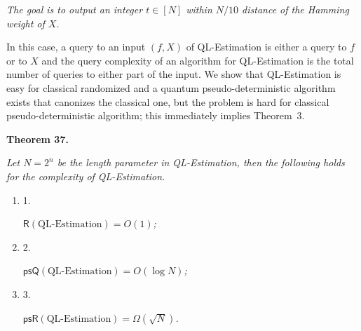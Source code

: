 \documentclass[10pt,a4paper]{article}
\begin{document}
\emph{The goal is to output an integer $t\in[N]$ within $N/10$ distance of the Hamming weight of $X$.}\par






In this case, a query to an input $(f,X)$ of QL-Estimation is either a query to $f$ or to $X$ and the query complexity of an algorithm for QL-Estimation is the total number of queries to either part of the input. We show that QL-Estimation is easy for classical randomized and a quantum pseudo-deterministic algorithm exists that canonizes the classical one, but the problem is hard for classical pseudo-deterministic algorithm; this immediately implies Theorem 3.\par





\par\medskip\noindent\textbf{
\textbf{Theorem 37}\textbf{.}
}\par



\emph{Let $N=2^{n}$ be the length parameter in QL-Estimation, then the following holds for the complexity of QL-Estimation.}\par


\begin{enumerate}


\item[] 
1. 


$\mathsf{R}({\text{QL-Estimation}})=O(1)$\emph{;}\par





\item[] 
2. 


$\mathsf{psQ}({\text{QL-Estimation}})=O(\log N)$\emph{;}\par





\item[] 
3. 


$\mathsf{psR}({\text{QL-Estimation}})=\Omega(\sqrt{N})$\emph{.}\par





\end{enumerate}
\end{document}

